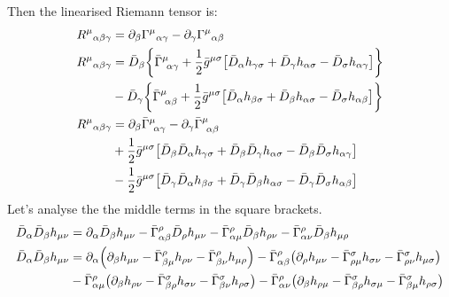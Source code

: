 \documentclass[12pt, letterpaper]{report}
\begin{document}
Then the linearised Riemann tensor is: 
\begin{align}
    {R}^{\mu}{}_{\alpha \beta \gamma } &=\partial_\beta{\Gamma}^{\mu}{}_{\alpha \gamma}-\partial_\gamma{\Gamma} ^{\mu}{}_{\alpha \beta} \nonumber\\
    {R}^{\mu}{}_{\alpha \beta \gamma } &= \bar{D}_\beta\qty{\bar{\Gamma}^{\mu}_{\ \alpha\gamma}+\frac{1}{2}\bar{g}^{\mu\sigma}\qty[\bar{D}_\alpha h_{\gamma\sigma}+\bar{D}_{\gamma}h_{\alpha\sigma}-\bar{D}_{\sigma}h_{\alpha\gamma}]} \nonumber\\
    &- \bar{D}_\gamma\qty{\bar{\Gamma}^{\mu}_{\ \alpha\beta}+\frac{1}{2}\bar{g}^{\mu\sigma}\qty[\bar{D}_\alpha h_{\beta\sigma}+\bar{D}_{\beta}h_{\alpha\sigma}-\bar{D}_{\sigma}h_{\alpha\beta}]} \nonumber\\
    {R}^{\mu}{}_{\alpha \beta \gamma } &= \partial_\beta \bar{\Gamma}^{\mu}_{\ \alpha\gamma}- \partial_\gamma\bar{\Gamma}^{\mu}_{\ \alpha\beta} \nonumber\\
    &+\frac{1}{2}\bar{g}^{\mu\sigma}\qty[ \bar{D}_\beta \bar{D}_\alpha h_{\gamma\sigma}+ \bar{D}_\beta \bar{D}_{\gamma}h_{\alpha\sigma}- \bar{D}_\beta \bar{D}_{\sigma}h_{\alpha\gamma}] \nonumber\\
    &-\frac{1}{2}\bar{g}^{\mu\sigma}\qty[ \bar{D}_\gamma \bar{D}_\alpha h_{\beta\sigma}+ \bar{D}_\gamma \bar{D}_{\beta}h_{\alpha\sigma}- \bar{D}_\gamma \bar{D}_{\sigma}h_{\alpha\beta}]\label{riemann pert step1}
\end{align}
Let's analyse the the middle terms in the square brackets. 
\begin{align}
    \bar{D}_\alpha \bar{D}_\beta h_{\mu\nu} &= \partial_\alpha \bar{D}_\beta h_{\mu\nu}- \bar{\Gamma}^{\rho}_{\alpha \beta}\bar{D}_\rho h_{\mu\nu}- \bar{\Gamma}^{\rho}_{\alpha \mu}\bar{D}_\beta h_{\rho\nu}- \bar{\Gamma}^{\rho}_{\alpha \nu}\bar{D}_\beta h_{\mu\rho} \nonumber\\
    \bar{D}_\alpha \bar{D}_\beta h_{\mu\nu} &= \partial_\alpha \qty(\partial_\beta h_{\mu\nu}- \bar{\Gamma}^{\rho}_{\beta \mu} h_{\rho\nu}- \bar{\Gamma}^{\rho}_{\beta \nu} h_{\mu\rho})
    - \bar{\Gamma}^{\rho}_{\alpha \beta}\qty(\partial_\rho h_{\mu\nu}- \bar{\Gamma}^{\sigma}_{\rho \mu} h_{\sigma\nu}- \bar{\Gamma}^{\sigma}_{\rho \nu} h_{\mu\sigma})\nonumber\\
    &- \bar{\Gamma}^{\rho}_{\alpha \mu}\qty(\partial_\beta h_{\rho\nu}- \bar{\Gamma}^{\sigma}_{\beta \rho} h_{\sigma\nu}- \bar{\Gamma}^{\sigma}_{\beta \nu} h_{\rho\sigma})
    - \bar{\Gamma}^{\rho}_{\alpha \nu}\qty(\partial_\beta h_{\rho\mu}- \bar{\Gamma}^{\sigma}_{\beta \rho} h_{\sigma\mu}- \bar{\Gamma}^{\sigma}_{\beta \mu} h_{\rho\sigma})\label{Cov derivative 2}
\end{align}
\end{document}
